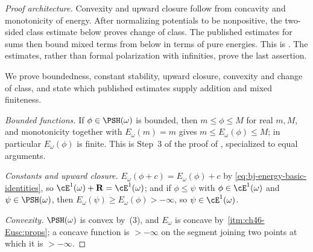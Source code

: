 \begin{proof}[Proof architecture]
Convexity and upward closure follow from concavity and monotonicity of
energy.  After normalizing potentials to be nonpositive, the two-sided
class estimate below proves change of class.  The published estimates for
sums then bound mixed terms from below in terms of pure energies.  This is
\cite[Theorem~7.8, Lemmas~7.9--7.10, and Corollary~7.11]{BJ22}.
The estimates, rather than formal polarization with infinities, prove the
last assertion.

We prove boundedness, constant stability, upward closure, convexity and
change of class, and state which published estimates supply addition and
mixed finiteness.

\emph{Bounded functions.}  If $\phi\in\PSH(\omega)$ is bounded, then
$m\le\phi\le M$ for real $m,M$, and monotonicity together with
$E_\omega(m)=m$ gives $m\le E_\omega(\phi)\le M$; in particular
$E_\omega(\phi)$ is finite.  This is Step~3 of the proof of
, specialized to equal arguments.

\emph{Constants and upward closure.}
$E_\omega(\phi+c)=E_\omega(\phi)+c$ by
\eqref{eq:bj-energy-basic-identities}, so $\cE^1(\omega)+\mathbf R
=\cE^1(\omega)$; and if $\phi\le\psi$ with
$\phi\in\cE^1(\omega)$ and $\psi\in\PSH(\omega)$, then
$E_\omega(\psi)\ge E_\omega(\phi)>-\infty$, so
$\psi\in\cE^1(\omega)$.

\emph{Convexity.}  $\PSH(\omega)$ is convex by
\,(3), and $E_\omega$ is concave by
\,\cref{itm:ch46-Eusc:props}; a concave function
is $>-\infty$ on the segment joining two points at which it is
$>-\infty$.


\end{proof}
